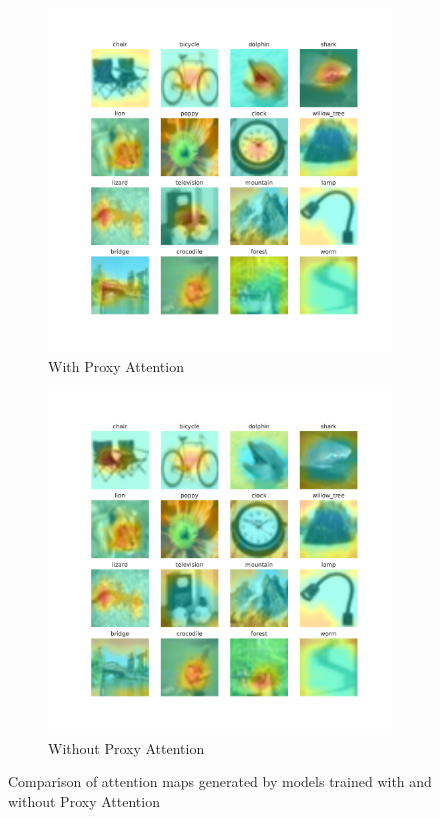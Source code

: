 \begin{figure}[h]
    \centering
    \begin{subfigure}[b]{0.7\textwidth}
        \includegraphics[width=\textwidth]{images/proxy.pdf}
        \caption{With Proxy Attention}
        \label{fig:proxy}
    \end{subfigure}
    \hfill
    \begin{subfigure}[b]{.7\textwidth}
        \includegraphics[width=\textwidth]{images/noproxy.pdf}
        \caption{Without Proxy Attention}
        \label{fig:noproxy}
    \end{subfigure}
    \caption{Comparison of attention maps generated by models trained with and without Proxy Attention}
    \label{fig:attention}
\end{figure}

